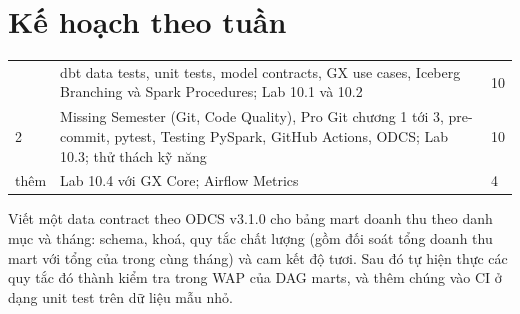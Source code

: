 \section{Kế hoạch theo tuần}
\begin{xltabular}{\textwidth}{@{}P{1.4cm} L P{1.4cm}@{}}
\toprule
{} &  &  \\
\midrule
\endhead
\bottomrule
{} & dbt data tests, unit tests, model contracts, GX use cases, Iceberg Branching và Spark Procedures; Lab 10.1 và 10.2 & 10 \\
2 & Missing Semester (Git, Code Quality), Pro Git chương 1 tới 3, pre-commit, pytest, Testing PySpark, GitHub Actions, ODCS; Lab 10.3; thử thách kỹ năng & 10 \\
thêm & Lab 10.4 với GX Core; Airflow Metrics & 4 \\
\end{xltabular}

\begin{thuthach}
Viết một data contract theo ODCS v3.1.0 cho bảng mart doanh thu theo danh mục và tháng: schema, khoá, quy tắc chất lượng (gồm đối soát tổng doanh thu mart với tổng  của  trong cùng tháng) và cam kết độ tươi. Sau đó tự hiện thực các quy tắc đó thành kiểm tra trong WAP của DAG marts, và thêm chúng vào CI ở dạng unit test trên dữ liệu mẫu nhỏ.
\end{thuthach}

